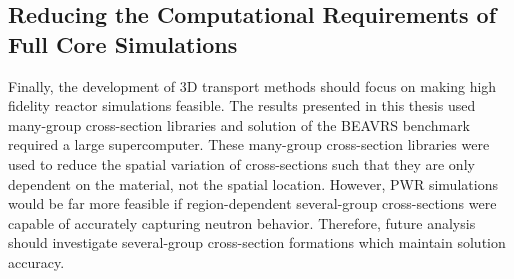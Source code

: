 \subsection{Reducing the Computational Requirements of Full Core Simulations}
	
Finally, the development of 3D transport methods should focus on making high fidelity reactor simulations feasible. The results presented in this thesis used many-group cross-section libraries and solution of the BEAVRS benchmark required a large supercomputer. These many-group cross-section libraries were used to reduce the spatial variation of cross-sections such that they are only dependent on the material, not the spatial location. However, \ac{PWR} simulations would be far more feasible if region-dependent several-group cross-sections were capable of accurately capturing neutron behavior. Therefore, future analysis should investigate several-group cross-section formations which maintain solution accuracy.